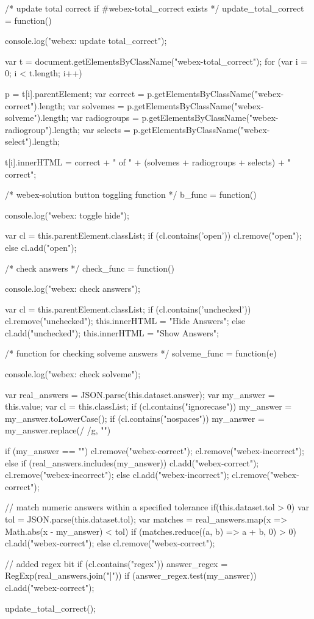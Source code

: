 \documentclass[
  ignorenonframetext,
]{beamer}
\begin{document}
/* update total correct if #webex-total_correct exists */
update_total_correct = function() {
  console.log("webex: update total_correct");

  var t = document.getElementsByClassName("webex-total_correct");
  for (var i = 0; i < t.length; i++) {
    p = t[i].parentElement;
    var correct = p.getElementsByClassName("webex-correct").length;
    var solvemes = p.getElementsByClassName("webex-solveme").length;
    var radiogroups = p.getElementsByClassName("webex-radiogroup").length;
    var selects = p.getElementsByClassName("webex-select").length;

    t[i].innerHTML = correct + " of " + (solvemes + radiogroups + selects) + " correct";
  }
}

/* webex-solution button toggling function */
b_func = function() {
  console.log("webex: toggle hide");

  var cl = this.parentElement.classList;
  if (cl.contains('open')) {
    cl.remove("open");
  } else {
    cl.add("open");
  }
}

/* check answers */
check_func = function() {
  console.log("webex: check answers");

  var cl = this.parentElement.classList;
  if (cl.contains('unchecked')) {
    cl.remove("unchecked");
    this.innerHTML = "Hide Answers";
  } else {
    cl.add("unchecked");
    this.innerHTML = "Show Answers";
  }
}

/* function for checking solveme answers */
solveme_func = function(e) {
  console.log("webex: check solveme");

  var real_answers = JSON.parse(this.dataset.answer);
  var my_answer = this.value;
  var cl = this.classList;
  if (cl.contains("ignorecase")) {
    my_answer = my_answer.toLowerCase();
  }
  if (cl.contains("nospaces")) {
    my_answer = my_answer.replace(/ /g, "")
  }

  if (my_answer == "") {
    cl.remove("webex-correct");
    cl.remove("webex-incorrect");
  } else if (real_answers.includes(my_answer)) {
    cl.add("webex-correct");
    cl.remove("webex-incorrect");
  } else {
    cl.add("webex-incorrect");
    cl.remove("webex-correct");
  }

  // match numeric answers within a specified tolerance
  if(this.dataset.tol > 0){
    var tol = JSON.parse(this.dataset.tol);
    var matches = real_answers.map(x => Math.abs(x - my_answer) < tol)
    if (matches.reduce((a, b) => a + b, 0) > 0) {
      cl.add("webex-correct");
    } else {
      cl.remove("webex-correct");
    }
  }

  // added regex bit
  if (cl.contains("regex")){
    answer_regex = RegExp(real_answers.join("|"))
    if (answer_regex.test(my_answer)) {
      cl.add("webex-correct");
    }
  }

  update_total_correct();
}
\end{document}
